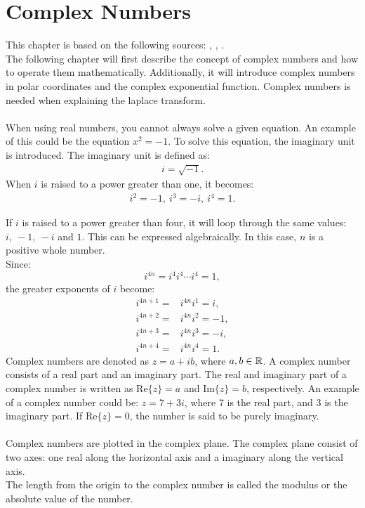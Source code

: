 \chapter{Complex Numbers}
This chapter is based on the following sources: \cite{complexpaul}, \cite{complexpurple}, \cite{complexnotebook}.
\\
\noindent 
The following chapter will first describe the concept of complex numbers and how to operate them mathematically. Additionally, it will introduce complex numbers in polar coordinates and the complex exponential function. Complex numbers is needed when explaining the laplace transform.
\\\\
\noindent 
When using real numbers, you cannot always solve a given equation. An example of this could be the equation $x^2=-1$. To solve this equation, the imaginary unit is introduced. The imaginary unit is defined as:
\begin{align*}
i=\sqrt{-1}.
\end{align*}
When $i$ is raised to a power greater than one, it becomes:
\begin{align*}
i^2=-1,\  i^3=-i,\  i^4=1.
\end{align*}

\noindent If $i$ is raised to a power greater than four, it will loop through the same values: $i, \ -1, \ -i$ and $1$. This can be expressed algebraically. In this case, $n$ is a  positive whole number. 
\\
Since: $$i^{4n} = i^4i^4\cdots i^4 = 1,$$
the greater exponents of $i$ become:
\begin{align*}
	i^{4n+1} =& i^{4n}i^1 = i, \\
	i^{4n+2} =& i^{4n}i^2 = -1, \\
	i^{4n+3} =& i^{4n}i^3 = -i, \\
	i^{4n+4} =& i^{4n}i^4 = 1.
\end{align*}
Complex numbers are denoted as $z = a+ib$, where $a,b\in \mathbb{R}$. A complex number consists of a real part and an imaginary part. The real and imaginary part of a complex number is written as $\text{Re}\{z\}=a$ and $\text{Im}\{z\}=b$, respectively.
An example of a complex number could be: $z=7+3i$, where 7 is the real part, and 3 is the imaginary part. 
If $\text{Re}\{z\}=0$, the number is said to be purely imaginary.  
\\\\
Complex numbers are plotted in the complex plane. The complex plane consist of two axes: one real along the horizontal axis and a imaginary along the vertical axis.\\
The length from the origin to the complex number is called the modulus or the absolute value of the number.

